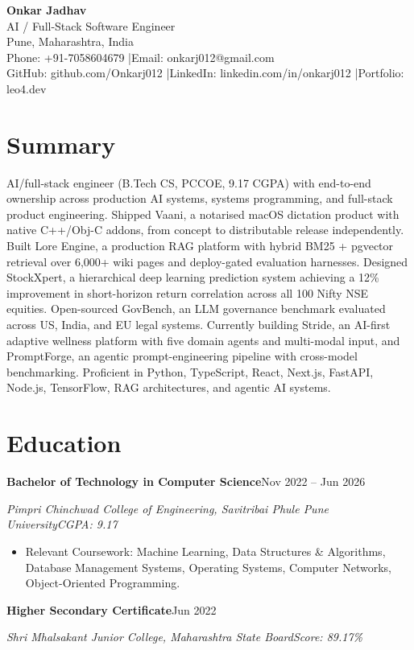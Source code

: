 \documentclass[a4paper,11pt]{article}
\newcommand{\entry}[2]{\noindent\textbf{#1}\hfill{#2}\par}
\newcommand{\subentry}[2]{\noindent\textit{#1}\hfill{\textit{#2}}\par\vspace{2pt}}
\begin{document}
\begin{center}
  {\LARGE \textbf{Onkar Jadhav}}\\[2pt]
  AI / Full-Stack Software Engineer\\[2pt]
  Pune, Maharashtra, India\\[2pt]
  Phone: +91-7058604679 \quad|\quad Email: onkarj012@gmail.com\\[2pt]
  GitHub: github.com/Onkarj012 \quad|\quad LinkedIn: linkedin.com/in/onkarj012 \quad|\quad Portfolio: leo4.dev
\end{center}

\section{Summary}
AI/full-stack engineer (B.Tech CS, PCCOE, 9.17 CGPA) with end-to-end ownership across production AI systems, systems programming, and full-stack product engineering. Shipped Vaani, a notarised macOS dictation product with native C++/Obj-C addons, from concept to distributable release independently. Built Lore Engine, a production RAG platform with hybrid BM25 + pgvector retrieval over 6,000+ wiki pages and deploy-gated evaluation harnesses. Designed StockXpert, a hierarchical deep learning prediction system achieving a 12\% improvement in short-horizon return correlation across all 100 Nifty NSE equities. Open-sourced GovBench, an LLM governance benchmark evaluated across US, India, and EU legal systems. Currently building Stride, an AI-first adaptive wellness platform with five domain agents and multi-modal input, and PromptForge, an agentic prompt-engineering pipeline with cross-model benchmarking. Proficient in Python, TypeScript, React, Next.js, FastAPI, Node.js, TensorFlow, RAG architectures, and agentic AI systems.

\section{Education}
\entry{Bachelor of Technology in Computer Science}{Nov 2022 -- Jun 2026}
\subentry{Pimpri Chinchwad College of Engineering, Savitribai Phule Pune University}{CGPA: 9.17}
\begin{itemize}
  \item Relevant Coursework: Machine Learning, Data Structures \& Algorithms, Database Management Systems, Operating Systems, Computer Networks, Object-Oriented Programming.
\end{itemize}
\vspace{2pt}
\entry{Higher Secondary Certificate}{Jun 2022}
\subentry{Shri Mhalsakant Junior College, Maharashtra State Board}{Score: 89.17\%}
\end{document}
